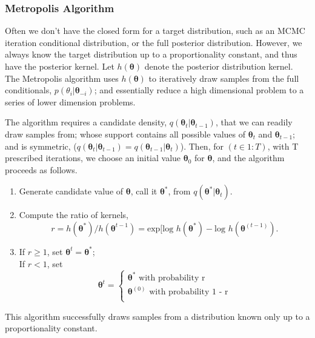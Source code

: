 \subsubsection{Metropolis Algorithm } %

Often we don't have the closed form for a target distribution, such as an MCMC iteration conditional distribution, or the full posterior distribution. However, we always know the target distribution up to a proportionality constant, and thus have the posterior kernel. Let $h(\pmb{\theta})$ denote the posterior distribution kernel. The Metropolis algorithm uses $h(\pmb{\theta})$ to iteratively draw samples from the full conditionals, $p(\theta_{i}|\pmb{\theta}_{-i})$; and essentially reduce a high dimensional problem to a series of lower dimension problems. 

The algorithm requires a  candidate density, $q(\pmb{\theta}_{t}|\pmb{\theta}_{t-1})$, that we can readily draw samples from; whose support contains all possible values of $\pmb{\theta}_{t}$ and $\pmb{\theta}_{t-1}$; and is symmetric, ($q(\pmb{\theta}_{t}|\pmb{\theta}_{t-1}) = q(\pmb{\theta}_{t-1}|\pmb{\theta}_{t})$). Then, for $(t \in 1:T)$, with T prescribed iterations, we choose an initial value $\pmb{\theta}_{0}$ for $\pmb{\theta}$, and the algorithm proceeds as follows.
\begin{enumerate}
\item Generate candidate value of $\pmb{\theta}$, call it $\pmb{\theta}^{*}$, from $q(\pmb{\theta}^{*}|\pmb{\theta}_{t})$.
\item Compute the ratio of kernels,
$$ r=h(\pmb{\theta}^{*})/h(\pmb{\theta}^{t-1}) = \text{exp}[\text{log }h(\pmb{\theta}^{*}) - \text{log }h(\pmb{\theta}^{(t-1)}). $$
\item If $r \geq  1$, set $\pmb{\theta}^{t} = \pmb{\theta}^{*}$; \\
            If $r < 1$, set 
            \[ 
            \pmb{\theta}^{t} = 
            \begin{cases} 
            \pmb{\theta}^{*} \text{ with probability r} \\
            \pmb{\theta}^{(0)} \text{ with probability 1 - r} \\
            \end{cases}
            \]
  \end{enumerate}
This algorithm successfully draws samples from a distribution known only up to a proportionality constant.   

